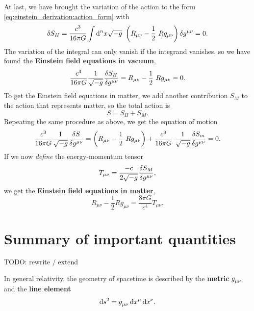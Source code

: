 At last, we have brought the variation of the action to the form \eqref{eq:einstein_derivation:action_form} with
\begin{equation}
	\variation{S_H} = \frac{c^3}{16 \pi G} \int \dif^n x \sqrt{-g} \left( R_{\mu \nu} - \frac{1}{2} R g_{\mu \nu} \right) \variation{g^{\mu \nu}} = 0 .
\end{equation}
The variation of the integral can only vanish if the integrand vanishes, so we have found the \textbf{Einstein field equations in vacuum},
\begin{equation}
	 \frac{c^3}{16 \pi G} \frac{1}{\sqrt{-g}} \diffv{S_H}{g^{\mu \nu}} = R_{\mu \nu} - \frac{1}{2} R g_{\mu \nu} = 0 .
\end{equation}
To get the Einstein field equations in matter, we add another contribution $S_M$ to the action that represents matter, so the total action is
\begin{equation}
	S = S_H + S_M .
\end{equation}
Repeating the same procedure as above, we get the equation of motion
\begin{equation}
	\frac{c^3}{16 \pi G} \frac{1}{\sqrt{-g}} \diffv{S}{g^{\mu \nu}} = \left( R_{\mu \nu} - \frac{1}{2} R g_{\mu \nu} \right) + \frac{c^3}{16 \pi G} \frac{1}{\sqrt{-g}} \frac{\variation{S_m}}{\variation{g^{\mu \nu}}} = 0 .
\end{equation}
If we now \emph{define} the energy-momentum tensor
\begin{equation}
	T_{\mu \nu} = \frac{-c}{2 \sqrt{-g}} \frac{\delta S_M}{\delta g^{\mu \nu}} ,
\end{equation}
we get the \textbf{Einstein field equations in matter},
\begin{equation}
	R_{\mu \nu} - \frac{1}{2} R g_{\mu \nu} = \frac{8 \pi G}{c^4} T_{\mu \nu} .
\end{equation}

\section{Summary of important quantities}
\label{chap:gr_summary} %

TODO: rewrite / extend

In general relativity, the geometry of spacetime is described by the \textbf{metric} $g\indices{_\mu_\nu}$ and the \textbf{line element}
\begin{equation}
	\dif s^2 = g\indices{_\mu_\nu} \dif x^\mu \dif x^\nu .
	\label{eq:def_line_elem}
\end{equation}

